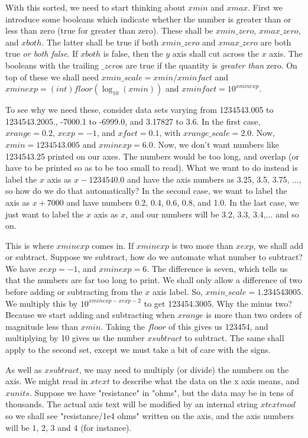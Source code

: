 \documentclass[12pt]{article}
\begin{document}
With this sorted, we need to start thinking about $xmin$ and $xmax$. First
we introduce some booleans which indicate whether the number is greater
than or less than zero (true for greater than zero). These shall be $xmin\_zero$,
 $xmax\_zero$, and $xboth$. The latter shall be true if both $xmin\_zero$ and 
$xmax\_zero$ are both true {\it or both false}. If $xboth$ is false, then
the $y$ axis shall cut across the $x$ axis.   The booleans with the trailing $\_zero$s
 are true if the quantity is {\it greater than} zero. On top of these
 we shall need $xmin\_scale=xmin/xminfact$ and $xminexp=(int)floor(\log_{10}(xmin))$
 and $xminfact=10^{xminexp}$.

To see why we need these, consider data sets varying from 1234543.005 to 1234543.2005.,
 -7000.1 to -6999.0, and 3.17827 to 3.6.  In the first case, $xrange=0.2$, 
$xexp=-1$, and $xfact=0.1$, with $xrange\_scale=2.0$. Now, $xmin=1234543.005$ 
 and $xminexp=6.0$. Now, we don't want numbers like 1234543.25 printed on our
 axes. The numbers would be too long, and overlap (or have to be printed so as to be too
small to read). What we want to do instead is label the $x$ axis as $x-1234540.0$
and have the axis numbers as 3.25, 3.5, 3.75, ..., so how do we do that
automatically? In the second case, we want to label the axis as $x+7000$ and
have numbers 0.2, 0.4, 0.6, 0.8, and 1.0. In the last case, we just want to label
the $x$ axis as $x$, and our numbers will be 3.2, 3.3, 3.4,... and so on.

This is where $xminexp$ comes in. If $xminexp$ is two more than $xexp$, we shall
 add or subtract. Suppose we subtract, how do we automate what number to subtract?
We have $xexp=-1$, and $xminexp=6$. The difference is seven, which tells us that
the numbers are far too long to print. We shall only allow a difference of two
 before adding or subtracting from the $x$ axis label. So, $xmin\_scale=1.234543005$.
We multiply this by $10^{xminexp-xexp-2}$ to get 123454.3005. Why the minus two?
Because we start adding and subtracting when $xrange$ is more than two orders
of magnitude less than $xmin$.  Taking the $floor$ of this gives us 123454, 
and multiplying by 10 gives us the number $xsubtract$ to subtract. The same shall apply
to the second set, except we must take a bit of care with the signs.

As well as $xsubtract$, we may need to multiply (or divide) the numbers on the axis.
We might read in $xtext$ to describe what the data on the x axis means, and $xunits$.
Suppose we have "resistance" in "ohms", but the data may be in tens of thousands.
The actual axis text will be modified by an internal string $xtextmod$ so we shall
see "resistance/1e4 ohms" written on the axis, and the axis numbers will be 1, 2, 3 and 4
 (for instance).
\end{document}
